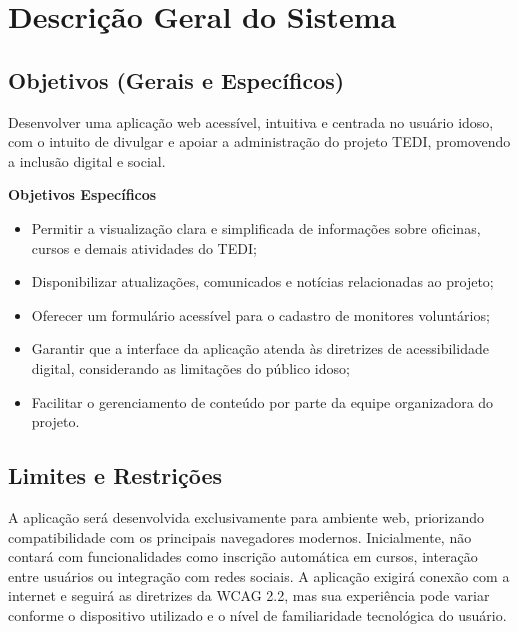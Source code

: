 \documentclass[a4paper,12pt]{article}
\begin{document}
\newpage
\section{Descrição Geral do Sistema}
\subsection{Objetivos (Gerais e Específicos)}

Desenvolver uma aplicação web acessível, intuitiva e centrada no usuário idoso, com o intuito de divulgar e apoiar a administração do projeto TEDI, promovendo a inclusão digital e social.

\textbf{Objetivos Específicos}
\begin{itemize}
    \item Permitir a visualização clara e simplificada de informações sobre oficinas, cursos e demais atividades do TEDI;
    \item Disponibilizar atualizações, comunicados e notícias relacionadas ao projeto;
    \item Oferecer um formulário acessível para o cadastro de monitores voluntários;
    \item Garantir que a interface da aplicação atenda às diretrizes de acessibilidade digital, considerando as limitações do público idoso;
    \item Facilitar o gerenciamento de conteúdo por parte da equipe organizadora do projeto.
\end{itemize}

\subsection{Limites e Restrições}
A aplicação será desenvolvida exclusivamente para ambiente web, priorizando compatibilidade com os principais navegadores modernos. Inicialmente, não contará com funcionalidades como inscrição automática em cursos, interação entre usuários ou integração com redes sociais. A aplicação exigirá conexão com a internet e seguirá as diretrizes da WCAG 2.2, mas sua experiência pode variar conforme o dispositivo utilizado e o nível de familiaridade tecnológica do usuário.
\end{document}
